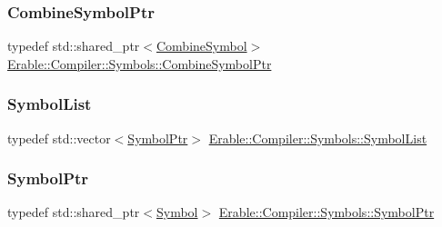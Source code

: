 \subsubsection{\texorpdfstring{CombineSymbolPtr}{CombineSymbolPtr}}
{\footnotesize\ttfamily typedef std\+::shared\+\_\+ptr$<$\mbox{\hyperlink{struct_erable_1_1_compiler_1_1_symbols_1_1_combine_symbol}{Combine\+Symbol}}$>$ \mbox{\hyperlink{namespace_erable_1_1_compiler_1_1_symbols_ad3326e636860b0452468de51ed673c8a}{Erable\+::\+Compiler\+::\+Symbols\+::\+Combine\+Symbol\+Ptr}}}

\mbox{\label{namespace_erable_1_1_compiler_1_1_symbols_a63e8157d2f729d4689d27bacad42f8ed}} 
\subsubsection{\texorpdfstring{SymbolList}{SymbolList}}
{\footnotesize\ttfamily typedef std\+::vector$<$\mbox{\hyperlink{namespace_erable_1_1_compiler_1_1_symbols_a8f0bc762f448ea4d84e8713ab3e140b9}{Symbol\+Ptr}}$>$ \mbox{\hyperlink{namespace_erable_1_1_compiler_1_1_symbols_a63e8157d2f729d4689d27bacad42f8ed}{Erable\+::\+Compiler\+::\+Symbols\+::\+Symbol\+List}}}

\mbox{\label{namespace_erable_1_1_compiler_1_1_symbols_a8f0bc762f448ea4d84e8713ab3e140b9}} 
\subsubsection{\texorpdfstring{SymbolPtr}{SymbolPtr}}
{\footnotesize\ttfamily typedef std\+::shared\+\_\+ptr$<$\mbox{\hyperlink{class_erable_1_1_compiler_1_1_symbols_1_1_symbol}{Symbol}}$>$ \mbox{\hyperlink{namespace_erable_1_1_compiler_1_1_symbols_a8f0bc762f448ea4d84e8713ab3e140b9}{Erable\+::\+Compiler\+::\+Symbols\+::\+Symbol\+Ptr}}}

\mbox{\label{namespace_erable_1_1_compiler_1_1_symbols_aff1ccebebde106c3c5f3cdca118a1d69}} 
